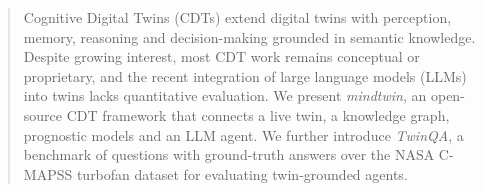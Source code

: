 \begin{abstract}
Cognitive Digital Twins (CDTs) extend digital twins with perception, memory, reasoning and
decision-making grounded in semantic knowledge. Despite growing interest, most CDT work remains
conceptual or proprietary, and the recent integration of large language models (LLMs) into twins
lacks quantitative evaluation. We present \emph{mindtwin}, an open-source CDT framework that
connects a live twin, a knowledge graph, prognostic models and an LLM agent. We further introduce
\emph{TwinQA}, a benchmark of questions with ground-truth answers over the NASA C-MAPSS turbofan
dataset for evaluating twin-grounded agents. 
\end{abstract}
